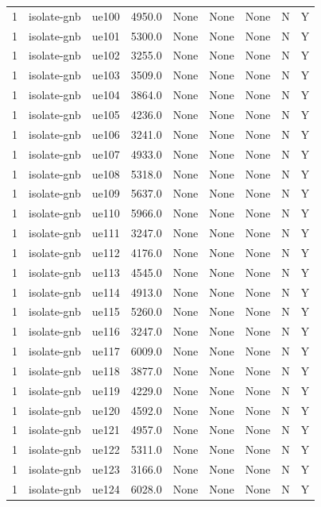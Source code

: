 \begin{table}[ht]
\begin{tabular}{|c|c|c|c|c|c|c|c|c|}
1 & isolate-gnb & ue100 & 4950.0 & None & None & None & N & Y \\
1 & isolate-gnb & ue101 & 5300.0 & None & None & None & N & Y \\
1 & isolate-gnb & ue102 & 3255.0 & None & None & None & N & Y \\
1 & isolate-gnb & ue103 & 3509.0 & None & None & None & N & Y \\
1 & isolate-gnb & ue104 & 3864.0 & None & None & None & N & Y \\
1 & isolate-gnb & ue105 & 4236.0 & None & None & None & N & Y \\
1 & isolate-gnb & ue106 & 3241.0 & None & None & None & N & Y \\
1 & isolate-gnb & ue107 & 4933.0 & None & None & None & N & Y \\
1 & isolate-gnb & ue108 & 5318.0 & None & None & None & N & Y \\
1 & isolate-gnb & ue109 & 5637.0 & None & None & None & N & Y \\
1 & isolate-gnb & ue110 & 5966.0 & None & None & None & N & Y \\
1 & isolate-gnb & ue111 & 3247.0 & None & None & None & N & Y \\
1 & isolate-gnb & ue112 & 4176.0 & None & None & None & N & Y \\
1 & isolate-gnb & ue113 & 4545.0 & None & None & None & N & Y \\
1 & isolate-gnb & ue114 & 4913.0 & None & None & None & N & Y \\
1 & isolate-gnb & ue115 & 5260.0 & None & None & None & N & Y \\
1 & isolate-gnb & ue116 & 3247.0 & None & None & None & N & Y \\
1 & isolate-gnb & ue117 & 6009.0 & None & None & None & N & Y \\
1 & isolate-gnb & ue118 & 3877.0 & None & None & None & N & Y \\
1 & isolate-gnb & ue119 & 4229.0 & None & None & None & N & Y \\
1 & isolate-gnb & ue120 & 4592.0 & None & None & None & N & Y \\
1 & isolate-gnb & ue121 & 4957.0 & None & None & None & N & Y \\
1 & isolate-gnb & ue122 & 5311.0 & None & None & None & N & Y \\
1 & isolate-gnb & ue123 & 3166.0 & None & None & None & N & Y \\
1 & isolate-gnb & ue124 & 6028.0 & None & None & None & N & Y \\

\end{tabular}
\end{table}
